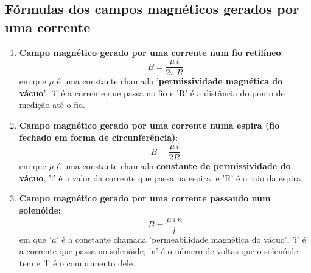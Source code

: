 \documentclass[12pt]{extarticle}
\newcommand{\<}{\langle}
\renewcommand{\>}{\rangle}
\theoremstyle{definition}
\begin{document}
\subsection{Fórmulas dos campos magnéticos gerados por uma corrente}
\begin{enumerate}
    \item \textbf{Campo magnético gerado por uma corrente num fio retilíneo}:
    \begin{equation}
        B = \frac{\mu\,i}{2\pi\,R}
    \end{equation}
    \noindent em que $\mu$ é uma constante chamada '\textbf{permissividade magnética do vácuo}', 'i' é a corrente que passa no fio e 'R' é a distância do ponto de medição até o fio.
    
    \item \textbf{Campo magnético gerado por uma corrente numa espira (fio fechado em forma de circunferência)}:
    \begin{equation}
        B = \frac{\mu\,i}{2R}
    \end{equation}
    \noindent em que $\mu$ é uma constante chamada \textbf{constante de permissividade do vácuo}, 'i' é o valor da corrente que passa na espira, e 'R' é o raio da espira.
    
    \item \textbf{Campo magnético gerado por uma corrente passando num solenóide:}
    \begin{equation}
        B = \frac{\mu\,i\,n}{l}
    \end{equation}
    \noindent em que '$\mu$' é a constante chamada 'permeabilidade magnética do vácuo', 'i' é a corrente que passa no solenóide, 'n' é o número de voltas que o solenóide tem e 'l' é o comprimento dele.
\end{enumerate}
\end{document}
